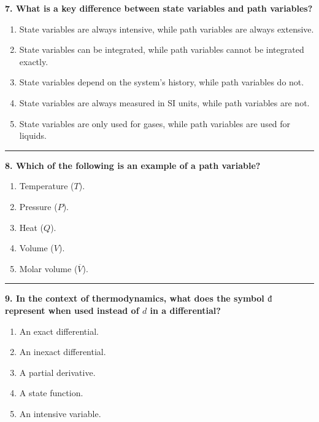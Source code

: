 \documentclass[
  9pt,
]{extbook}
\providecommand{\tightlist}{%
  \setlength{\itemsep}{0pt}\setlength{\parskip}{0pt}}
\theoremstyle{definition}
\theoremstyle{definition}
\theoremstyle{definition}
\theoremstyle{remark}
\begin{document}
\textbf{7. What is a key difference between state variables and path variables?}

\begin{enumerate}
\def\labelenumi{\alph{enumi}.}
\tightlist
\item
  State variables are always intensive, while path variables are always extensive.
\item
  State variables can be integrated, while path variables cannot be integrated exactly.
\item
  State variables depend on the system's history, while path variables do not.
\item
  State variables are always measured in SI units, while path variables are not.
\item
  State variables are only used for gases, while path variables are used for liquids.
\end{enumerate}

\begin{center}\rule{0.5\linewidth}{0.5pt}\end{center}

\textbf{8. Which of the following is an example of a path variable?}

\begin{enumerate}
\def\labelenumi{\alph{enumi}.}
\tightlist
\item
  Temperature (\(T\)).
\item
  Pressure (\(P\)).
\item
  Heat (\(Q\)).
\item
  Volume (\(V\)).
\item
  Molar volume (\(\overline{V}\)).
\end{enumerate}

\begin{center}\rule{0.5\linewidth}{0.5pt}\end{center}

\textbf{9. In the context of thermodynamics, what does the symbol \(đ\) represent when used instead of \(d\) in a differential?}

\begin{enumerate}
\def\labelenumi{\alph{enumi}.}
\tightlist
\item
  An exact differential.
\item
  An inexact differential.
\item
  A partial derivative.
\item
  A state function.
\item
  An intensive variable.
\end{enumerate}
\end{document}
